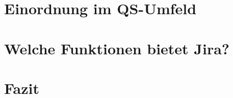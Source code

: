 \documentclass[a4paper, 10pt]{scrartcl}
\begin{document}
\section{Einordnung im QS-Umfeld}

\section{Welche Funktionen bietet Jira?}

\section{Fazit}
\end{document}
